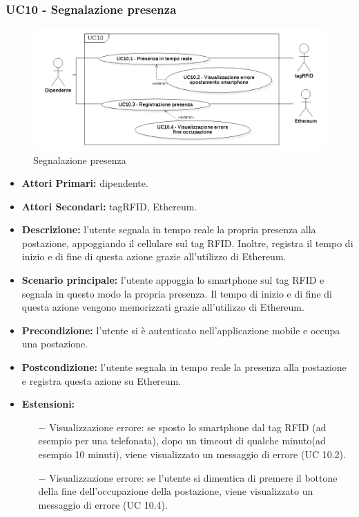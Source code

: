\subsubsection{ UC10 - Segnalazione presenza}
\begin{figure}[H]
	\centering
	\includegraphics[width=15cm]{res/images/UC10.png}
	\caption{Segnalazione presenza}
	\label{fig:Segnalazione presenza}
\end{figure}
\begin{itemize}
           	\item\textbf{Attori Primari:} dipendente.
           	\item\textbf{Attori Secondari:} tagRFID, Ethereum.
           	\item\textbf{Descrizione:} l’utente segnala in tempo reale la propria presenza alla postazione, appoggiando il cellulare sul tag RFID. Inoltre, registra il tempo di inizio e di fine di questa azione grazie all'utilizzo di Ethereum.
           	\item\textbf{Scenario principale:} l’utente appoggia lo smartphone sul tag RFID e segnala in questo modo la propria presenza.
           	Il tempo di inizio e di fine di questa azione vengono memorizzati grazie all'utilizzo di Ethereum.
           	\item\textbf{Precondizione:} l’utente si è autenticato nell'applicazione mobile e occupa una postazione.
           	\item\textbf{Postcondizione:} l’utente segnala in tempo reale la presenza alla postazione e registra questa azione su Ethereum.
           	\item\textbf{Estensioni:} 
           	\begin{itemize}
           		\item[$-$] Visualizzazione errore: se sposto lo smartphone dal tag RFID (ad esempio per una telefonata), 
           		dopo un timeout di qualche minuto(ad esempio 10 minuti), viene visualizzato un messaggio di errore (UC 10.2).
           		\item[$-$] Visualizzazione errore: se l'utente si dimentica di premere il bottone della fine dell'occupazione della postazione,
           		viene visualizzato un messaggio di errore (UC 10.4).
           	\end{itemize}
\end{itemize}
